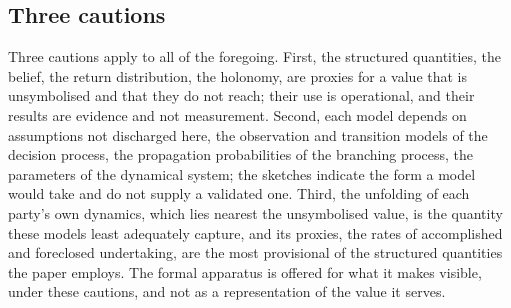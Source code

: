 \subsection{Three cautions}
\label{p11:sec:app-cautions}

Three cautions apply to all of the foregoing. First, the structured quantities, the belief, the return distribution, the holonomy, are proxies for a value that is unsymbolised and that they do not reach; their use is operational, and their results are evidence and not measurement. Second, each model depends on assumptions not discharged here, the observation and transition models of the decision process, the propagation probabilities of the branching process, the parameters of the dynamical system; the sketches indicate the form a model would take and do not supply a validated one. Third, the unfolding of each party's own dynamics, which lies nearest the unsymbolised value, is the quantity these models least adequately capture, and its proxies, the rates of accomplished and foreclosed undertaking, are the most provisional of the structured quantities the paper employs. The formal apparatus is offered for what it makes visible, under these cautions, and not as a representation of the value it serves.
